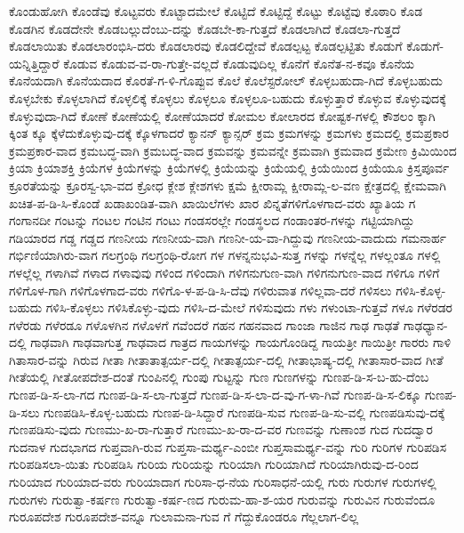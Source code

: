 {ಕೊಂಡುಹೋಗಿ
ಕೊಂಡೆವು
ಕೊಟ್ಟವರು
ಕೊಟ್ಟಾದಮೇಲೆ
ಕೊಟ್ಟಿದೆ
ಕೊಟ್ಟಿದ್ದೆ
ಕೊಟ್ಟು
ಕೊಟ್ಟೆವು
ಕೊಠಾರಿ
ಕೊಡ
ಕೊಡಗಿನ
ಕೊಡದೇನೇ
ಕೊಡಬಲ್ಲುದೆಂಬು-ದನ್ನು
ಕೊಡಬೇ-ಕಾ-ಗುತ್ತದೆ
ಕೊಡಲಾಗಿದೆ
ಕೊಡಲಾ-ಗುತ್ತದೆ
ಕೊಡಲಾಯಿತು
ಕೊಡಲಾರಂಭಿಸಿ-ದರು
ಕೊಡಲಾರವು
ಕೊಡಲಿದ್ದೇವೆ
ಕೊಡಲ್ಪಟ್ಟ
ಕೊಡಲ್ಪಟ್ಟಿತು
ಕೊಡುಗೆ
ಕೊಡುಗೆ-ಯನ್ನಿತ್ತಿದ್ದಾರೆ
ಕೊಡುವ
ಕೊಡುವ-ವ-ರಾ-ಗುತ್ತೇ-ವಲ್ಲದೆ
ಕೊಡುವುದಿಲ್ಲ
ಕೊನೆಗೆ
ಕೊನೆತ-ನ-ಕವೂ
ಕೊನೆಯ
ಕೊನೆಯದಾಗಿ
ಕೊನೆಯದಾದ
ಕೊರತೆ-ಗ-ಳಿ-ಗೊಪ್ಪುವ
ಕೊಲೆ
ಕೊಲೆಸ್ಟರೋಲ್
ಕೊಳ್ಳಬಹುದಾ-ಗಿದೆ
ಕೊಳ್ಳಬಹುದು
ಕೊಳ್ಳಬೇಕು
ಕೊಳ್ಳಲಾಗಿದೆ
ಕೊಳ್ಳಲಿಕ್ಕೆ
ಕೊಳ್ಳಲು
ಕೊಳ್ಳಲೂ
ಕೊಳ್ಳಲೂ-ಬಹುದು
ಕೊಳ್ಳುತ್ತಾರೆ
ಕೊಳ್ಳುವ
ಕೊಳ್ಳುವುದಕ್ಕೆ
ಕೊಳ್ಳುವುದಾ-ಗಿದೆ
ಕೋಣೆ
ಕೋಣೆಯಲ್ಲಿ
ಕೋಣೆಯಾದರೆ
ಕೋಮಲ
ಕೋಲಾರದ
ಕೋಷ್ಟಕ-ಗಳಲ್ಲಿ
ಕೌಶಲಂ
ಕ್ಕಾಗಿ
ಕ್ಕಿಂತ
ಕ್ಕೂ
ಕ್ಕೆಳೆದುಕೊಳ್ಳುವು-ದಕ್ಕೆ
ಕ್ಕೊಳಗಾದರೆ
ಕ್ಯಾನನ್
ಕ್ಯಾನ್ಸರ್
ಕ್ರಮ
ಕ್ರಮಗಳನ್ನು
ಕ್ರಮಗಳು
ಕ್ರಮದಲ್ಲಿ
ಕ್ರಮಪ್ರಕಾರ
ಕ್ರಮಪ್ರಕಾರ-ವಾದ
ಕ್ರಮಬದ್ಧ-ವಾಗಿ
ಕ್ರಮಬದ್ಧ-ವಾದ
ಕ್ರಮವನ್ನು
ಕ್ರಮವನ್ನೇ
ಕ್ರಮವಾಗಿ
ಕ್ರಮವಾದ
ಕ್ರಮೇಣ
ಕ್ರಿಮಿಯಿಂದ
ಕ್ರಿಯಾ
ಕ್ರಿಯಾಶಕ್ತಿ
ಕ್ರಿಯೆಗಳ
ಕ್ರಿಯೆಗಳನ್ನು
ಕ್ರಿಯೆಗಳಲ್ಲಿ
ಕ್ರಿಯೆಯನ್ನು
ಕ್ರಿಯೆಯಲ್ಲಿ
ಕ್ರಿಯೆಯಿಂದ
ಕ್ರಿಯೆಯೂ
ಕ್ರಿಸ್ತಪೂರ್ವ
ಕ್ರೂರತೆಯನ್ನು
ಕ್ರೂರಸ್ವ-ಭಾ-ವದ
ಕ್ರೋಧ
ಕ್ಲೇಶ
ಕ್ಲೇಶಗಳು
ಕ್ಷಮೆ
ಕ್ಷೀರಾಮ್ಲ
ಕ್ಷೀರಾಮ್ಲ-ಲ-ವಣ
ಕ್ಷೇತ್ರದಲ್ಲಿ
ಕ್ಷೇಮವಾಗಿ
ಖಚಿತ-ಪ-ಡಿ-ಸಿ-ಕೊಂಡೆ
ಖಡಾಖಂಡಿತ-ವಾಗಿ
ಖಾಯಿಲೆಗಳು
ಖಾರ
ಖಿನ್ನತೆಗಳಿಗೊಳಗಾದ-ವರು
ಖ್ಯಾತಿಯ
ಗ
ಗಂಗಾನದೀ
ಗಂಟನ್ನು
ಗಂಟಲ
ಗಂಟಿನ
ಗಂಟು
ಗಂಡಸರಲ್ಲೇ
ಗಂಡಸ್ಥಲದ
ಗಂಡಾಂತರ-ಗಳನ್ನು
ಗಟ್ಟಿಯಾಗಿದ್ದು
ಗಡಿಯಾರದ
ಗಡ್ಡ
ಗಡ್ಡದ
ಗಣನೀಯ
ಗಣನೀಯ-ವಾಗಿ
ಗಣನೀ-ಯ-ವಾ-ಗಿದ್ದುವು
ಗಣನೀಯ-ವಾದುದು
ಗಮನಾರ್ಹ
ಗರ್ಭಿಣಿಯಾಗಿರು-ವಾಗ
ಗಲಗ್ರಂಥಿ
ಗಲಗ್ರಂಥಿ-ರೋಗ
ಗಳ
ಗಳನ್ನನುಭವಿ-ಸುತ್ತ
ಗಳನ್ನು
ಗಳನ್ನೆಲ್ಲ
ಗಳಲ್ಲಂತೂ
ಗಳಲ್ಲಿ
ಗಳಲ್ಲೆಲ್ಲ
ಗಳಾಗಿವೆ
ಗಳಾದ
ಗಳಾವುವು
ಗಳಿಂದ
ಗಳಿಂದಾಗಿ
ಗಳಿಗನುಗುಣ-ವಾಗಿ
ಗಳಿಗನುಗುಣ-ವಾದ
ಗಳಿಗೂ
ಗಳಿಗೆ
ಗಳಿಗೊಳ-ಗಾಗಿ
ಗಳಿಗೊಳಗಾದ-ವರು
ಗಳಿಗೊ-ಳ-ಪ-ಡಿ-ಸಿ-ದೆವು
ಗಳಿರುವಾತ
ಗಳಿಲ್ಲವಾ-ದರೆ
ಗಳಿಸಲು
ಗಳಿಸಿ-ಕೊಳ್ಳ-ಬಹುದು
ಗಳಿಸಿ-ಕೊಳ್ಳಲು
ಗಳಿಸಿಕೊಳ್ಳು-ವುದು
ಗಳಿಸಿ-ದ-ಮೇಲೆ
ಗಳಿಸುವುದು
ಗಳು
ಗಳುಂಟಾ-ಗುತ್ತವೆ
ಗಳೂ
ಗಳೆರಡರ
ಗಳೆರಡು
ಗಳೆರಡೂ
ಗಳೊಳಗಿನ
ಗಳೊಳಗೆ
ಗವೆಂದರೆ
ಗಹನ
ಗಹನವಾದ
ಗಾಂಜಾ
ಗಾಜಿನ
ಗಾಢ
ಗಾಢತೆ
ಗಾಢಧ್ಯಾನ-ದಲ್ಲಿ
ಗಾಢವಾಗಿ
ಗಾಢವಾಗುತ್ತ
ಗಾಢವಾದ
ಗಾತ್ರದ
ಗಾಯಗಳನ್ನು
ಗಾಯಗೊಂಡಿದ್ದ
ಗಾಯತ್ರೀ
ಗಾಯಿತ್ರೀ
ಗಾರರು
ಗಾಳಿ
ಗಿತಾಸಾರ-ವನ್ನು
ಗಿರುವ
ಗೀತಾ
ಗೀತಾತಾತ್ಪರ್ಯ-ದಲ್ಲಿ
ಗೀತಾತ್ಪರ್ಯ-ದಲ್ಲಿ
ಗೀತಾಭಾಷ್ಯ-ದಲ್ಲಿ
ಗೀತಾಸಾರ-ವಾದ
ಗೀತೆ
ಗೀತೆಯಲ್ಲಿ
ಗೀತೋಪದೇಶ-ದಂತೆ
ಗುಂಪಿನಲ್ಲಿ
ಗುಂಪು
ಗುಟ್ಟನ್ನು
ಗುಣ
ಗುಣಗಳನ್ನು
ಗುಣಪ-ಡಿ-ಸ-ಬ-ಹು-ದೆಂಬ
ಗುಣಪ-ಡಿ-ಸ-ಲಾ-ಗದ
ಗುಣಪ-ಡಿ-ಸ-ಲಾ-ಗುತ್ತದೆ
ಗುಣಪ-ಡಿ-ಸ-ಲಾ-ದ-ವು-ಗ-ಳಾ-ಗಿವೆ
ಗುಣಪ-ಡಿ-ಸ-ಲಿಕ್ಕೂ
ಗುಣಪ-ಡಿ-ಸಲು
ಗುಣಪಡಿಸಿ-ಕೊಳ್ಳ-ಬಹುದು
ಗುಣಪ-ಡಿ-ಸಿದ್ದಾರೆ
ಗುಣಪಡಿ-ಸುವ
ಗುಣಪ-ಡಿ-ಸು-ವಲ್ಲಿ
ಗುಣಪಡಿಸುವು-ದಕ್ಕೆ
ಗುಣಪಡಿಸು-ವುದು
ಗುಣಮು-ಖ-ರಾ-ಗುತ್ತಾರೆ
ಗುಣಮು-ಖ-ರಾ-ದ-ವರ
ಗುಣವನ್ನು
ಗುಣಾಂಶ
ಗುದ
ಗುದದ್ವಾರ
ಗುದನಾಳ
ಗುದಭಾಗದ
ಗುಪ್ತವಾಗಿ-ರುವ
ಗುಪ್ತಸಾ-ಮರ್ಥ್ಯ-ಎಂಬೀ
ಗುಪ್ತಸಾಮರ್ಥ್ಯ-ವನ್ನು
ಗುರಿ
ಗುರಿಗಳ
ಗುರಿಪಡಿಸ
ಗುರಿಪಡಿಸಲಾ-ಯಿತು
ಗುರಿಪಡಿಸಿ
ಗುರಿಯ
ಗುರಿಯನ್ನು
ಗುರಿಯಾಗಿ
ಗುರಿಯಾಗಿದೆ
ಗುರಿಯಾಗಿರುವು-ದ-ರಿಂದ
ಗುರಿಯಾದ
ಗುರಿಯಾದ-ವರು
ಗುರಿಯಾದಾಗ
ಗುರಿಸಾ-ಧ-ನೆಯ
ಗುರಿಸಾಧನೆ-ಯಲ್ಲಿ
ಗುರು
ಗುರುಗಳ
ಗುರುಗಳಲ್ಲಿ
ಗುರುಗಳು
ಗುರುತ್ವಾ-ಕರ್ಷಣ
ಗುರುತ್ವಾ-ಕರ್ಷ-ಣದ
ಗುರುಮ-ಹಾ-ಶ-ಯರ
ಗುರುವನ್ನು
ಗುರುವಿನ
ಗುರುವೆಂದೂ
ಗುರೂಪದೇಶ
ಗುರೂಪದೇಶ-ವನ್ನೂ
ಗುಲಾಮನಾ-ಗುವ
ಗೆ
ಗೆದ್ದುಕೊಂಡರೂ
ಗೆಲ್ಲಲಾಗ-ಲಿಲ್ಲ
}
